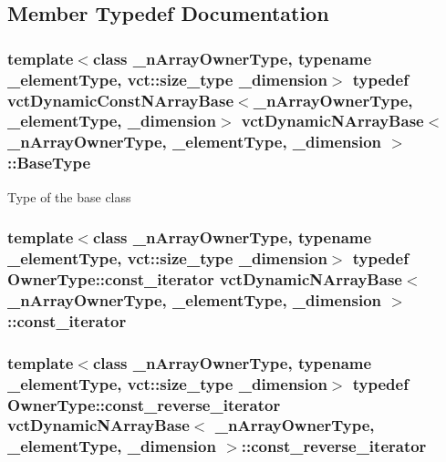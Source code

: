 \subsection{Member Typedef Documentation}
\hypertarget{classvct_dynamic_n_array_base_ac2c95af53fa85b36f67bdc9ffe0d1737}{
\subsubsection[{Base\-Type}]{\setlength{\rightskip}{0pt plus 5cm}template$<$class \-\_\-n\-Array\-Owner\-Type, typename \-\_\-element\-Type, vct\-::size\-\_\-type \-\_\-dimension$>$ typedef {\bf vct\-Dynamic\-Const\-N\-Array\-Base}$<$\-\_\-n\-Array\-Owner\-Type, \-\_\-element\-Type, \-\_\-dimension$>$ {\bf vct\-Dynamic\-N\-Array\-Base}$<$ \-\_\-n\-Array\-Owner\-Type, \-\_\-element\-Type, \-\_\-dimension $>$\-::{\bf Base\-Type}}}\label{classvct_dynamic_n_array_base_ac2c95af53fa85b36f67bdc9ffe0d1737}
Type of the base class \hypertarget{classvct_dynamic_n_array_base_a77193963c2949409a70d820f87ba9ddb}{
\subsubsection[{const\-\_\-iterator}]{\setlength{\rightskip}{0pt plus 5cm}template$<$class \-\_\-n\-Array\-Owner\-Type, typename \-\_\-element\-Type, vct\-::size\-\_\-type \-\_\-dimension$>$ typedef Owner\-Type\-::const\-\_\-iterator {\bf vct\-Dynamic\-N\-Array\-Base}$<$ \-\_\-n\-Array\-Owner\-Type, \-\_\-element\-Type, \-\_\-dimension $>$\-::{\bf const\-\_\-iterator}}}\label{classvct_dynamic_n_array_base_a77193963c2949409a70d820f87ba9ddb}
\hypertarget{classvct_dynamic_n_array_base_a63dd44f3924be6ea9240772286f7bfd2}{
\subsubsection[{const\-\_\-reverse\-\_\-iterator}]{\setlength{\rightskip}{0pt plus 5cm}template$<$class \-\_\-n\-Array\-Owner\-Type, typename \-\_\-element\-Type, vct\-::size\-\_\-type \-\_\-dimension$>$ typedef Owner\-Type\-::const\-\_\-reverse\-\_\-iterator {\bf vct\-Dynamic\-N\-Array\-Base}$<$ \-\_\-n\-Array\-Owner\-Type, \-\_\-element\-Type, \-\_\-dimension $>$\-::{\bf const\-\_\-reverse\-\_\-iterator}}}\label{classvct_dynamic_n_array_base_a63dd44f3924be6ea9240772286f7bfd2}
